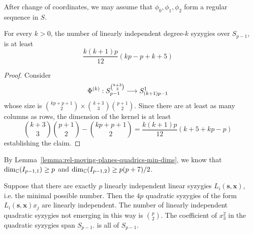 \documentclass[fleqn,reqno]{amsart}
\begin{document}
\begin{remark}
After change of coordinates,
we may assume that $\phi_0,\phi_1,\phi_2$ form a regular sequence in $S$.
\end{remark}

\begin{lemma}
\label{lemma:rel-moving-planes-quadrics-min-dims}
For every $k>0$, the number of linearly independent degree-$k$ syzygies over $S_{p-1}$,
is at least
\[
	\frac{k(k+1)p}{12}(kp-p+k+5)
\]
\end{lemma}

\begin{proof}
Consider
\[
	\Phi^{(k)}:S_{p-1}^{\binom{k+3}{3}}\longrightarrow S_{(k+1)p-1}^1
\]
whose size is $\binom{kp+p+1}{2}\times\binom{k+3}{3}\binom{p+1}{2}$.
Since there are at least as many columns as rows,
the dimension of the kernel is at least
\[
	\binom{k+3}{3}\binom{p+1}{2}-\binom{kp+p+1}{2}=\frac{k(k+1)p}{12}(k+5+kp-p)
\]
establishing the claim.
\end{proof}

\begin{paragraf}
\label{rem:rel-moving-planes-quadrics-num-syz}
By Lemma~\ref{lemma:rel-moving-planes-quadrics-min-dims},
we know that $\dim_{\mathbb{C}}(I_{p-1,1})\geq p$ and
$\dim_{\mathbb{C}}(I_{p-1,2})\geq p(p+7)/2$.
\end{paragraf}

\begin{lemma}
\label{lemma:rel-moving-planes-quadrics-main}
Suppose that there are exactly $p$ linearly independent linear syzygies $L_i(\mathbf s,\mathbf x)$,
i.e. the minimal possible number.
Then the $4p$ quadratic syzygies of the form $L_i(\mathbf s,\mathbf x)x_j$
are linearly independent.
The number of linearly independent quadratic syzygies not emerging in this way is $\binom{p}{2}$.
The coefficient of $x_3^2$ in the quadratic syzygies span $S_{p-1}$.
is all of $S_{p-1}$.
\end{lemma}
\end{document}
